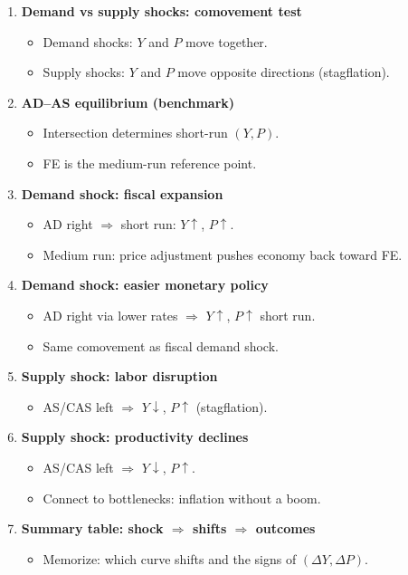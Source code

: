 \documentclass[11pt]{article}
\begin{document}
\begin{enumerate}
\item \textbf{Demand vs supply shocks: comovement test}
\begin{itemize}
\item Demand shocks: $Y$ and $P$ move together.
\item Supply shocks: $Y$ and $P$ move opposite directions (stagflation).
\end{itemize}

\item \textbf{AD--AS equilibrium (benchmark)}
\begin{itemize}
\item Intersection determines short-run $(Y,P)$.
\item FE is the medium-run reference point.
\end{itemize}

\item \textbf{Demand shock: fiscal expansion}
\begin{itemize}
\item AD right $\Rightarrow$ short run: $Y\uparrow$, $P\uparrow$.
\item Medium run: price adjustment pushes economy back toward FE.
\end{itemize}

\item \textbf{Demand shock: easier monetary policy}
\begin{itemize}
\item AD right via lower rates $\Rightarrow$ $Y\uparrow$, $P\uparrow$ short run.
\item Same comovement as fiscal demand shock.
\end{itemize}

\item \textbf{Supply shock: labor disruption}
\begin{itemize}
\item AS/CAS left $\Rightarrow$ $Y\downarrow$, $P\uparrow$ (stagflation).
\end{itemize}

\item \textbf{Supply shock: productivity declines}
\begin{itemize}
\item AS/CAS left $\Rightarrow$ $Y\downarrow$, $P\uparrow$.
\item Connect to bottlenecks: inflation without a boom.
\end{itemize}

\item \textbf{Summary table: shock $\Rightarrow$ shifts $\Rightarrow$ outcomes}
\begin{itemize}
\item Memorize: which curve shifts and the signs of $(\Delta Y,\Delta P)$.
\end{itemize}


\end{enumerate}
\end{document}
